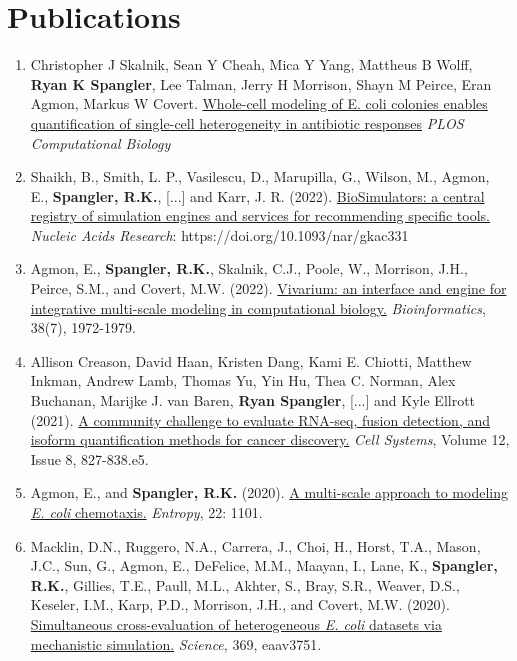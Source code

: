 \section{Publications}
\begin{enumerate}%
\item Christopher J Skalnik, Sean Y Cheah, Mica Y Yang, Mattheus B Wolff, \textbf{Ryan K Spangler}, Lee Talman, Jerry H Morrison, Shayn M Peirce, Eran Agmon, Markus W Covert. \href{https://journals.plos.org/ploscompbiol/article?id=10.1371/journal.pcbi.1011232}{Whole-cell modeling of E. coli colonies enables quantification of single-cell heterogeneity in antibiotic responses} \textit{PLOS Computational Biology}
\item Shaikh, B., Smith, L. P., Vasilescu, D., Marupilla, G., Wilson, M., Agmon, E., \textbf{Spangler, R.K.}, [...] and Karr, J. R. (2022). \href{https://doi.org/10.1093/nar/gkac331}{BioSimulators: a central registry of simulation engines and services for recommending specific tools.} \textit{Nucleic Acids Research}: https://doi.org/10.1093/nar/gkac331
\item Agmon, E., \textbf{Spangler, R.K.}, Skalnik, C.J., Poole, W., Morrison, J.H., Peirce, S.M., and Covert, M.W. (2022). \href{https://academic.oup.com/bioinformatics/advance-article-abstract/doi/10.1093/bioinformatics/btac049/6522109}{Vivarium: an interface and engine for integrative multi-scale modeling in computational biology.} \textit{Bioinformatics}, 38(7), 1972-1979.
\item Allison Creason, David Haan, Kristen Dang, Kami E. Chiotti, Matthew Inkman, Andrew Lamb, Thomas Yu, Yin Hu, Thea C. Norman, Alex Buchanan, Marijke J. van Baren, \textbf{Ryan Spangler}, [...] and Kyle Ellrott (2021). \href{https://www.sciencedirect.com/science/article/pii/S2405471221002076}{A community challenge to evaluate RNA-seq, fusion detection, and isoform quantification methods for cancer discovery.} \textit{Cell Systems}, Volume 12, Issue 8, 827-838.e5. 
\item Agmon, E., and \textbf{Spangler, R.K.} (2020). \href{https://www.mdpi.com/1099-4300/22/10/1101}{A multi-scale approach to modeling \textit{E. coli} chemotaxis.} \textit{Entropy}, 22: 1101.
\item Macklin, D.N., Ruggero, N.A., Carrera, J., Choi, H., Horst, T.A., Mason, J.C., Sun, G., Agmon, E., DeFelice, M.M., Maayan, I., Lane, K., \textbf{Spangler, R.K.}, Gillies, T.E., Paull, M.L., Akhter, S., Bray, S.R., Weaver, D.S., Keseler, I.M., Karp, P.D., Morrison, J.H., and Covert, M.W. (2020). \href{https://science.sciencemag.org/content/369/6502/eaav3751.abstract}{Simultaneous cross-evaluation of heterogeneous \textit{E. coli} datasets via mechanistic simulation.} \textit{Science}, 369, eaav3751.

\end{enumerate}
